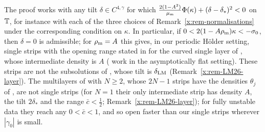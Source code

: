 \begin{remark}\label{rem:any-tilt}
The proof works with any tilt $\delta\in C^{4,\gamma}$ for which $\frac{2(1-A^2)}{\mu_{\mathrm m}}\Phi(\kappa)+(\delta-\delta_*)^2<0$ on $\mathbb{T}$, for instance with each of the three choices of
Remark~\ref{x:rem-normalisations} under the corresponding condition on $\kappa$. In particular, if $0<2(1-A\rho_{\mathrm m})\kappa<-\sigma_0$, then $\delta=0$ is admissible; for $\rho_{\mathrm m}=A$ this gives, in our
periodic H\"older setting, single strips with the opening range stated in \cite[(7.13)]{LM26} for the curved single layer of \cite{LM26}, whose intermediate density is $A$ (\cite{LM26} work in
the asymptotically flat setting). These strips are not the subsolutions of \cite{LM26}, whose tilt is $\delta_{\rm LM}$ (Remark~\ref{x:rem-LM26-layer}). The multilayers of
\cite[Sec.~7.5]{LM26} with $N\ge2$, whose $2N-1$ strips have the densities $\theta_j$ of \cite[(7.14)]{LM26}, are not single strips (for $N=1$ their only intermediate strip has density $A$,
the tilt $2\delta_*$ and the range $\bar c<\frac12$; Remark~\ref{x:rem-LM26-layer}); for fully unstable data they reach any $0<\bar c<1$, and so open faster than our
single strips wherever $|\gamma_0|$ is small.
\end{remark}

